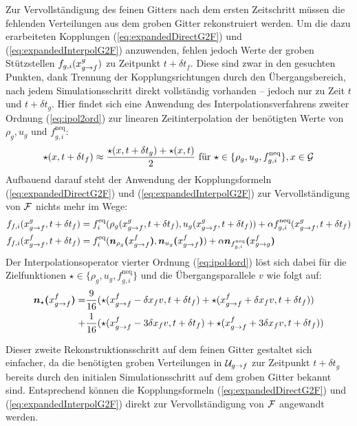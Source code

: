 \begin{description}[style=unboxed,leftmargin=0cm]
\item[Vervollständigung von \(\F\) zu Zeitpunkt \(t+\delta t_f\):] Zur Vervollständigung des feinen Gitters nach dem ersten Zeitschritt müssen die fehlenden Verteilungen aus dem groben Gitter rekonstruiert werden. Um die dazu erarbeiteten Kopplungen (\ref{eq:expandedDirectG2F}) und (\ref{eq:expandedInterpolG2F}) anzuwenden, fehlen jedoch Werte der groben Stützstellen \(\smash{f_{g,i}(x_{g \to f}^g})\) zu Zeitpunkt \(t+\delta t_f\). Diese sind zwar in den gesuchten Punkten, dank Trennung der Kopplungsrichtungen durch den Übergangsbereich, nach jedem Simulationsschritt direkt vollständig vorhanden -- jedoch nur zu Zeit \(t\) und \(t+\delta t_g\). Hier findet sich eine Anwendung des Interpolationsverfahrens zweiter Ordnung (\ref{eq:ipol2ord}) zur linearen Zeitinterpolation der benötigten Werte von \(\rho_g, u_g\) und \(f_{g,i}^\text{neq}\):
\[\star(x,t+\delta t_f) \approx \frac{\star(x,t+\delta t_g) + \star(x,t)}{2} \text{ für } \star \in \{\rho_g,u_g,f_{g,i}^\text{neq}\}, x \in \mathcal{G}\]
Aufbauend darauf steht der Anwendung der Kopplungsformeln (\ref{eq:expandedDirectG2F}) und (\ref{eq:expandedInterpolG2F}) zur Vervollständigung von \(\F\) nichts mehr im Wege:
\begin{align*}
f_{f,i}(x_{g \to f}^g,t+\delta t_f) &= f_i^\text{eq}(\rho_g(x_{g \to f}^g,t+\delta t_f), u_g(x_{g \to f}^g,t+\delta t_f)) + \alpha f_{g,i}^\text{neq}(x_{g \to f}^g,t+\delta t_f) \\
f_{f,i}(x_{g \to f}^f,t+\delta t_f) &= f_i^\text{eq}(\boldsymbol{n}_{\rho_g}\boldsymbol{(}{x_{g \to f}^f}\boldsymbol{)}, \boldsymbol{n}_{u_g}\boldsymbol{(}{x_{g \to f}^f}\boldsymbol{)}) + \alpha \boldsymbol{n}_{f_{g,i}^\text{neq}}\boldsymbol{(}{x_{g \to g}^f}\boldsymbol{)}
\end{align*}
Der Interpolationsoperator vierter Ordnung (\ref{eq:ipol4ord}) löst sich dabei für die Zielfunktionen \(\star \in \{\rho_g,u_g,f_{g,i}^\text{neq}\}\) und die Übergangsparallele \(v\) wie folgt auf:
\begin{align*}
\boldsymbol{n}_{\star}\boldsymbol{(}{x_{g \to f}^f}\boldsymbol{)} = &\frac{9}{16}(\star(x_{g \to f}^f-\delta x_f v, t+\delta t_f) + \star(x_{g \to f}^f+\delta x_f v, t+\delta t_f))\\
+ &\frac{1}{16}(\star(x_{g \to f}^f-3\delta x_f v, t+\delta t_f) + \star(x_{g \to f}^f+3\delta x_f v, t+\delta t_f))
\end{align*}

\item[Vervollständigung von \(\F\) zu Zeitpunkt \(t+\delta t_g\):] Dieser zweite Rekonstruktionsschritt auf dem feinen Gitter gestaltet sich einfacher, da die benötigten groben Verteilungen in \(\mathcal{U}_{g \to f}\) zur Zeitpunkt \(t+\delta t_g\) bereits durch den initialen Simulationsschritt auf dem groben Gitter bekannt sind. Entsprechend können die Kopplungsformeln (\ref{eq:expandedDirectG2F}) und (\ref{eq:expandedInterpolG2F}) direkt zur Vervollständigung von \(\F\) angewandt werden.


\end{description}
